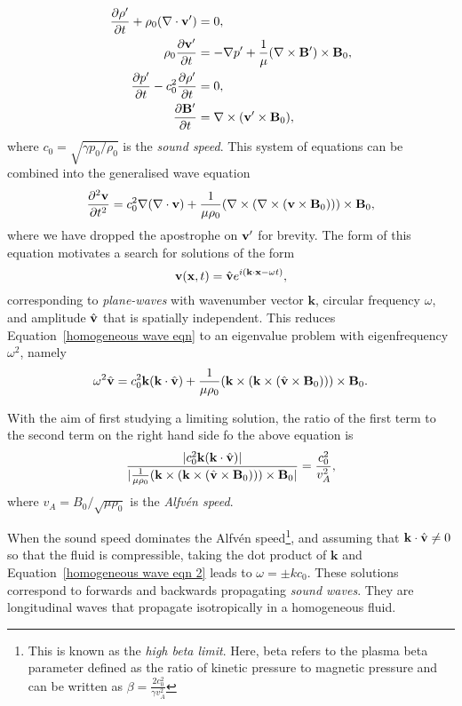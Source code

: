 \documentclass[12pt]{../style-files/ociamthesis}
\begin{document}
\begin{align}
	\frac{\partial\rho'}{\partial t} + \rho_0(\nabla\cdot\mathbf{v}') &= 0, \label{cont eqn lin} \\
	\rho_0\frac{\partial\mathbf{v}'}{\partial t} &= -\nabla p' + \frac{1}{\mu}(\nabla\times\mathbf{B}')\times\mathbf{B}_0, \label{mom eqn lin} \\
	\frac{\partial p'}{\partial t} - c_0^2\frac{\partial\rho'}{\partial t} &= 0, \label{energy eqn lin} \\
	\frac{\partial\mathbf{B}'}{\partial t} &= \nabla\times(\mathbf{v}'\times\mathbf{B}_0), \label{ind eqn lin}
\end{align}
where $c_0 = \sqrt{\gamma p_0/\rho_0}$ is the \textit{sound speed}. This system of equations can be combined into the generalised wave equation
\begin{equation}
	\frac{\partial^2\mathbf{v}}{\partial t^2} = c_0^2\nabla(\nabla\cdot\mathbf{v}) + \frac{1}{\mu\rho_0}(\nabla\times(\nabla\times(\mathbf{v}\times\mathbf{B}_0)))\times\mathbf{B}_0, \label{homogeneous wave eqn}
\end{equation}
where we have dropped the apostrophe on $\mathbf{v}'$ for brevity. The form of this equation motivates a search for solutions of the form
\begin{equation}
	\mathbf{v}(\mathbf{x}, t) = \hat{\mathbf{v}}e^{i(\mathbf{k}\cdot\mathbf{x} - \omega t)},
\end{equation}
corresponding to \textit{plane-waves} with wavenumber vector $\mathbf{k}$, circular frequency $\omega$, and amplitude $\hat{\mathbf{v}}$ that is spatially independent. This reduces Equation~\eqref{homogeneous wave eqn} to an eigenvalue problem with eigenfrequency $\omega^2$, namely
\begin{equation}
	\omega^2\hat{\mathbf{v}} = c_0^2\mathbf{k}(\mathbf{k}\cdot\hat{\mathbf{v}}) + \frac{1}{\mu\rho_0}(\mathbf{k}\times(\mathbf{k}\times(\hat{\mathbf{v}}\times\mathbf{B}_0)))\times\mathbf{B}_0. \label{homogeneous wave eqn 2}
\end{equation}

With the aim of first studying a limiting solution, the ratio of the first term to the second term on the right hand side fo the above equation is
\begin{equation}
	\frac{|c_0^2\mathbf{k}(\mathbf{k}\cdot\hat{\mathbf{v}})|}{|\frac{1}{\mu\rho_0}(\mathbf{k}\times(\mathbf{k}\times(\hat{\mathbf{v}}\times\mathbf{B}_0)))\times\mathbf{B}_0|} = \frac{c_0^2}{v_A^2},
\end{equation}
where $v_A = B_0/\sqrt{\mu\rho_0}$ is the \textit{Alfv\'{e}n speed}.

When the sound speed dominates the Alfv\'{e}n speed\footnote{This is known as the \textit{high beta limit}. Here, beta refers to the plasma beta parameter defined as the ratio of kinetic pressure to magnetic pressure and can be written as $\beta = \frac{2c_0^2}{\gamma v_A^2}$}, and assuming that $\mathbf{k}\cdot\hat{\mathbf{v}} \neq 0$ so that the fluid is compressible, taking the dot product of $\mathbf{k}$ and Equation~\eqref{homogeneous wave eqn 2} leads to $\omega = \pm kc_0$. These solutions correspond to forwards and backwards propagating \textit{sound waves}. They are longitudinal waves that propagate isotropically in a homogeneous fluid.
\end{document}

